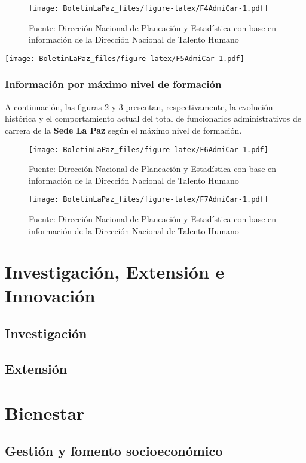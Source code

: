 \documentclass[
]{book}
\begin{document}
\begin{figure}
\centering
\texttt{[image: BoletinLaPaz\_files/figure-latex/F4AdmiCar-1.pdf]}
\caption{\label{fig:F4AdmiCar}Fuente: Dirección Nacional de Planeación y Estadística con base en información de la Dirección Nacional de Talento Humano}
\end{figure}

\texttt{[image: BoletinLaPaz\_files/figure-latex/F5AdmiCar-1.pdf]}

\hypertarget{informaciuxf3n-por-muxe1ximo-nivel-de-formaciuxf3n-1}{%
\subsection{Información por máximo nivel de formación}\label{informaciuxf3n-por-muxe1ximo-nivel-de-formaciuxf3n-1}}

A continuación, las figuras \ref{fig:F6AdmiCar} y \ref{fig:F7AdmiCar} presentan, respectivamente, la evolución histórica y el comportamiento actual del total de funcionarios administrativos de carrera de la \textbf{Sede La Paz} según el máximo nivel de formación.

\begin{figure}
\centering
\texttt{[image: BoletinLaPaz\_files/figure-latex/F6AdmiCar-1.pdf]}
\caption{\label{fig:F6AdmiCar}Fuente: Dirección Nacional de Planeación y Estadística con base en información de la Dirección Nacional de Talento Humano}
\end{figure}

\begin{figure}
\centering
\texttt{[image: BoletinLaPaz\_files/figure-latex/F7AdmiCar-1.pdf]}
\caption{\label{fig:F7AdmiCar}Fuente: Dirección Nacional de Planeación y Estadística con base en información de la Dirección Nacional de Talento Humano}
\end{figure}

\hypertarget{Inv}{%
\chapter{Investigación, Extensión e Innovación}\label{Inv}}

\hypertarget{investigaciuxf3n}{%
\section{Investigación}\label{investigaciuxf3n}}

\hypertarget{extensiuxf3n}{%
\section{Extensión}\label{extensiuxf3n}}

\hypertarget{Bie}{%
\chapter{Bienestar}\label{Bie}}

\hypertarget{gestiuxf3n-y-fomento-socioeconuxf3mico}{%
\section{Gestión y fomento socioeconómico}\label{gestiuxf3n-y-fomento-socioeconuxf3mico}}

  
\end{document}
